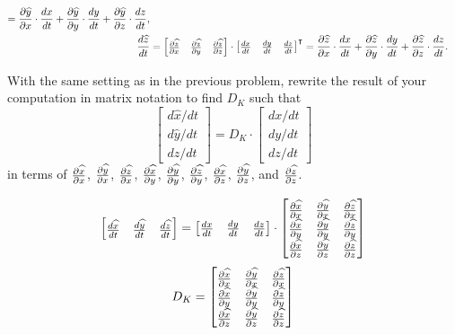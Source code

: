 \documentclass[newpage,hints,handout]{ximera}
\begin{document}
\begin{problem}
\begin{freeResponse}
\begin{align*}
      = \pp[\hat y]{x}\cdot\dd[x]{t} + \pp[\hat y]{y}\cdot\dd[y]{t} + \pp[\hat y]{z}\cdot\dd[z]{t}, \\
      \dd[\hat z]{t} &= \begin{bmatrix} \pp[\hat z]{x} & \pp[\hat z]{y} & \pp[\hat z]{z} \end{bmatrix} \cdot \begin{bmatrix} \dd[x]{t} & \dd[y]{t} & \dd[z]{t} \end{bmatrix}^\transpose
      = \pp[\hat z]{x}\cdot\dd[x]{t} + \pp[\hat z]{y}\cdot\dd[y]{t} + \pp[\hat z]{z}\cdot\dd[z]{t}.
    \end{align*}
  \end{freeResponse}
\end{problem}

\begin{problem}
  With the same setting as in the previous problem, rewrite the result
  of your computation in matrix notation to find $D_K$ such that
\[
\begin{bmatrix}
d\hat{x}/dt \\ d\hat{y}/dt \\ d\hat{z}/dt%
\end{bmatrix}
=D_K \cdot \begin{bmatrix}
dx/dt \\ dy/dt \\ dz/dt
\end{bmatrix}
\]
in terms of $\pp[\hat x]{x}$, $\pp[\hat y]{x}$, $\pp[\hat z]{x}$,
$\pp[\hat x]{y}$, $\pp[\hat y]{y}$, $\pp[\hat z]{y}$, $\pp[\hat x]{z}$,
$\pp[\hat y]{z}$, and $\pp[\hat z]{z}$.

\begin{freeResponse}
\[
\begin{bmatrix}
\frac{d\hat{x}}{dt} & \frac{d\hat{y}}{dt} & \frac{d\hat{z}}{dt}%
\end{bmatrix}
=
\begin{bmatrix}
\frac{dx}{dt} & \frac{dy}{dt} & \frac{dz}{dt}%
\end{bmatrix}\cdot
\begin{bmatrix}
\pp[\hat x]{x} & \pp[\hat y]{x} & \pp[\hat z]{x} \\
\pp[\hat x]{y} & \pp[\hat y]{y} & \pp[\hat z]{y} \\
\pp[\hat x]{z} &\pp[\hat y]{z} & \pp[\hat z]{z}
\end{bmatrix}
\]
\[
D_K = 
\begin{bmatrix}
\pp[\hat x]{x} & \pp[\hat y]{x} & \pp[\hat z]{x} \\
\pp[\hat x]{y} & \pp[\hat y]{y} & \pp[\hat z]{y} \\
\pp[\hat x]{z} &\pp[\hat y]{z} & \pp[\hat z]{z}
\end{bmatrix}
\]

\end{freeResponse}
\end{problem}
\end{document}
